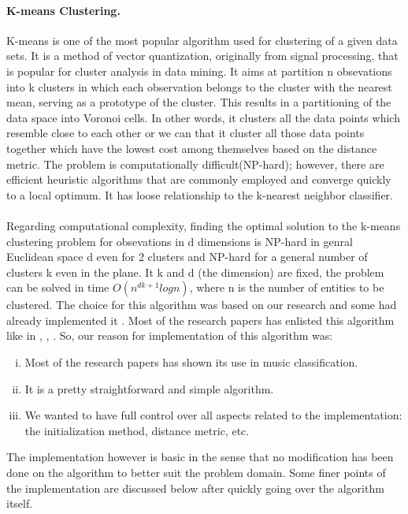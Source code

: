 \paragraph{K-means Clustering.}

K-means is one of the most popular algorithm used for clustering of a given data sets. It is a method of vector quantization, originally
from signal processing, that is popular for cluster analysis in data mining. It aims at partition n obsevations into k clusters in which each observation
belongs to the cluster with the nearest mean, serving as a prototype of the cluster. This results in a partitioning of the data space into Voronoi cells. 
In other words, it clusters all the data points which resemble close
to each other or we can that it cluster all those data points together which have the lowest cost among themselves based on the distance metric.
The problem is computationally difficult(NP-hard); however, there are efficient heuristic algorithms that are commonly employed and converge quickly to a local optimum.
It has loose relationship to the k-nearest neighbor classifier.\\ 
\\
Regarding computational complexity, finding the optimal solution to the k-means clustering problem for obsevations in d dimensions is NP-hard in genral Euclidean space
d even for 2 clusters and NP-hard for a general number of clusters k even in the plane. It k and d (the dimension) are fixed, the problem can be solved in time
$O(n^{dk+1}logn)$, where n is the number of entities to be clustered.
The choice for this algorithm was based on our research and some had already implemented it \cite{Haggblade2011}. Most of the research papers has enlisted this algorithm like in \cite{muller2011}, 
\cite{Hamerly2002}, \cite{Haggblade2011}. So, our reason for implementation of this algorithm was:
\begin{enumerate}[(i)]
        \item Most of the research papers has shown its use in music classification.
        \item It is a pretty straightforward and simple algorithm.
        \item We wanted to have full control over all aspects related to the implementation: the initialization method, distance metric, etc.
\end{enumerate}
The implementation however is basic in the sense that no modification has been done on the algorithm to better suit the problem domain. 
Some finer points of the implementation are discussed below after quickly going over the algorithm itself.\\ 
